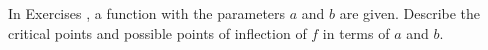 {\noindent In Exercises}
{, a function with the parameters $a$ and $b$ are given. Describe the critical points and possible points of inflection of $f$ in terms of $a$ and $b$.
}
